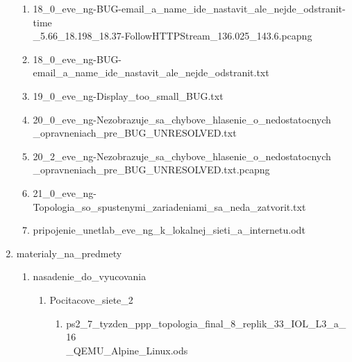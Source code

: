 \begin{enumerate}[noitemsep,label*=\thesection.\arabic*.]
\begin{enumerate}[noitemsep,label*=\arabic*.]
        \item 18\_0\_eve\_ng-BUG-email\_a\_name\_ide\_nastavit\_ale\_nejde\_odstranit-time\\\_5.66\_18.198\_18.37-FollowHTTPStream\_136.025\_143.6.pcapng
        \item \label{item:mail_meno_nejde_odstranit} 18\_0\_eve\_ng-BUG-email\_a\_name\_ide\_nastavit\_ale\_nejde\_odstranit.txt
        \item \label{item:display_too_small} 19\_0\_eve\_ng-Display\_too\_small\_BUG.txt
        \item \label{item:nezobrazene_chybove_hlasenie} 20\_0\_eve\_ng-Nezobrazuje\_sa\_chybove\_hlasenie\_o\_nedostatocnych\\\_opravneniach\_pre\_BUG\_UNRESOLVED.txt
        \item \label{item:nezobrazene_chybove_hlasenie_pcap} 20\_2\_eve\_ng-Nezobrazuje\_sa\_chybove\_hlasenie\_o\_nedostatocnych\\\_opravneniach\_pre\_BUG\_UNRESOLVED.txt.pcapng
        \item \label{item:zatvorenie_topologie_so_spustenymi_zariadeniami} 21\_0\_eve\_ng-Topologia\_so\_spustenymi\_zariadeniami\_sa\_neda\_zatvorit.txt
        \item pripojenie\_unetlab\_eve\_ng\_k\_lokalnej\_sieti\_a\_internetu.odt
    \end{enumerate}
    
    \item materialy\_na\_predmety
    
    \begin{enumerate}[noitemsep,label*=\arabic*.]
        \item nasadenie\_do\_vyucovania
        
        \begin{enumerate}[noitemsep,label*=\arabic*.]
            \item Pocitacove\_siete\_2
            
            \begin{enumerate}[noitemsep,label*=\arabic*.]
                \item \label{item:nasadenie_ps2_benchmark} ps2\_7\_tyzden\_ppp\_topologia\_final\_8\_replik\_33\_IOL\_L3\_a\_16\\\_QEMU\_Alpine\_Linux.ods
            \end{enumerate}
        \end{enumerate}
        

\end{enumerate}
\end{enumerate}
